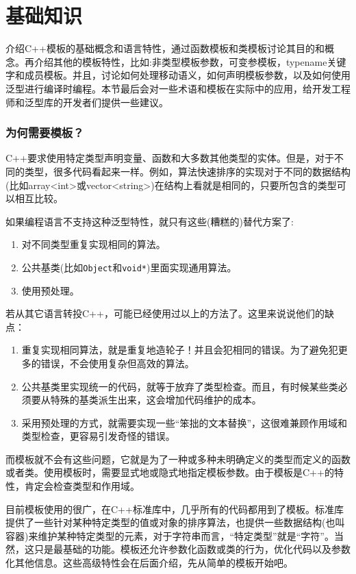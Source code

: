 \part{基础知识}

介绍C++模板的基础概念和语言特性，通过函数模板和类模板讨论其目的和概念。再介绍其他的模板特性，比如:非类型模板参数，可变参模板，typename关键字和成员模板。并且，讨论如何处理移动语义，如何声明模板参数，以及如何使用泛型进行编译时编程。本节最后会对一些术语和模板在实际中的应用，给开发工程师和泛型库的开发者们提供一些建议。

\section*{为何需要模板？}

C++要求使用特定类型声明变量、函数和大多数其他类型的实体。但是，对于不同的类型，很多代码看起来一样。例如，算法快速排序的实现对于不同的数据结构(比如array<int>或vector<string>)在结构上看就是相同的，只要所包含的类型可以相互比较。

如果编程语言不支持这种泛型特性，就只有这些(糟糕的)替代方案了:

\begin{enumerate}
  \item 对不同类型重复实现相同的算法。
  \item 公共基类(比如\texttt{Object}和\texttt{void*})里面实现通用算法。
  \item 使用预处理。
\end{enumerate}

若从其它语言转投C++，可能已经使用过以上的方法了。这里来说说他们的缺点：

\begin{enumerate}
  \item 重复实现相同算法，就是重复地造轮子！并且会犯相同的错误。为了避免犯更多的错误，不会使用复杂但高效的算法。

  \item 公共基类里实现统一的代码，就等于放弃了类型检查。而且，有时候某些类必须要从特殊的基类派生出来，这会增加代码维护的成本。

  \item 采用预处理的方式，就需要实现一些“笨拙的文本替换”，这很难兼顾作用域和类型检查，更容易引发奇怪的错误。
\end{enumerate}

而模板就不会有这些问题，它就是为了一种或多种未明确定义的类型而定义的函数或者类。使用模板时，需要显式地或隐式地指定模板参数。由于模板是C++的特性，肯定会检查类型和作用域。

目前模板使用的很广，在C++标准库中，几乎所有的代码都用到了模板。标准库提供了一些针对某种特定类型的值或对象的排序算法，也提供一些数据结构(也叫容器)来维护某种特定类型的元素，对于字符串而言，“特定类型”就是“字符”。当然，这只是最基础的功能。模板还允许参数化函数或类的行为，优化代码以及参数化其他信息。这些高级特性会在后面介绍，先从简单的模板开始吧。













